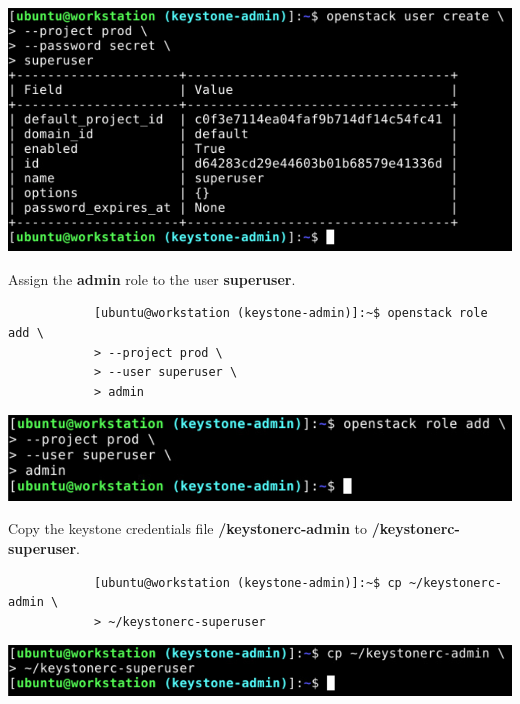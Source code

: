 \documentclass[letterpaper, 12pt]{article}
\begin{document}
\begin{enumerate}
\begin{labstep}
        \begin{center}
            \includegraphics[width=\linewidth]{images/part1/step5.png}
        \end{center}
    \end{labstep}

    \begin{labstep}
        Assign the \textbf{admin} role to the user \textbf{superuser}.
        \begin{lstlisting}
            [ubuntu@workstation (keystone-admin)]:~$ openstack role add \
            > --project prod \
            > --user superuser \
            > admin
        \end{lstlisting}

        \begin{center}
            \includegraphics[width=\linewidth]{images/part1/step6.png}
        \end{center}
    \end{labstep}

    \begin{labstep}
        Copy the keystone credentials file \textbf{\texttildemid/keystonerc-admin} to
        \textbf{\texttildemid/keystonerc-superuser}.
        \begin{lstlisting}
            [ubuntu@workstation (keystone-admin)]:~$ cp ~/keystonerc-admin \
            > ~/keystonerc-superuser
        \end{lstlisting}

        \begin{center}
            \includegraphics[width=\linewidth]{images/part1/step7.png}
        \end{center}
    \end{labstep}


\end{enumerate}
\end{document}
